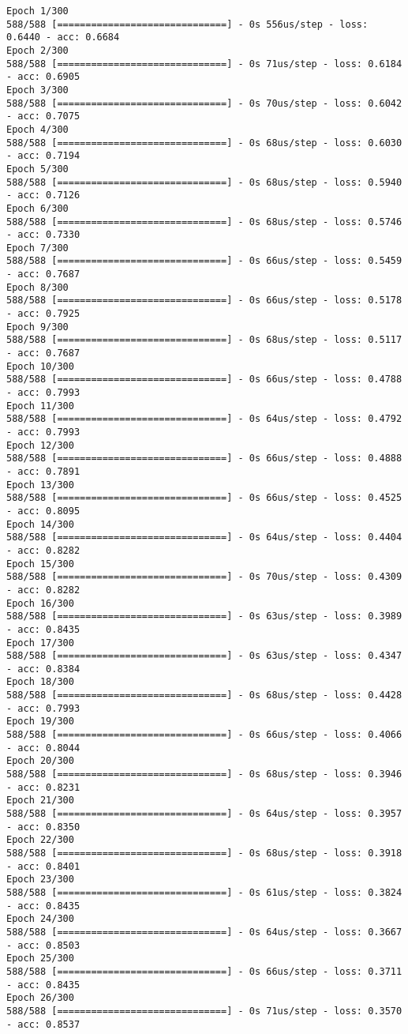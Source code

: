 \documentclass[11pt]{article}
\begin{document}
    \begin{Verbatim}[commandchars=\\\{\}]
Epoch 1/300
588/588 [==============================] - 0s 556us/step - loss: 0.6440 - acc: 0.6684
Epoch 2/300
588/588 [==============================] - 0s 71us/step - loss: 0.6184 - acc: 0.6905
Epoch 3/300
588/588 [==============================] - 0s 70us/step - loss: 0.6042 - acc: 0.7075
Epoch 4/300
588/588 [==============================] - 0s 68us/step - loss: 0.6030 - acc: 0.7194
Epoch 5/300
588/588 [==============================] - 0s 68us/step - loss: 0.5940 - acc: 0.7126
Epoch 6/300
588/588 [==============================] - 0s 68us/step - loss: 0.5746 - acc: 0.7330
Epoch 7/300
588/588 [==============================] - 0s 66us/step - loss: 0.5459 - acc: 0.7687
Epoch 8/300
588/588 [==============================] - 0s 66us/step - loss: 0.5178 - acc: 0.7925
Epoch 9/300
588/588 [==============================] - 0s 68us/step - loss: 0.5117 - acc: 0.7687
Epoch 10/300
588/588 [==============================] - 0s 66us/step - loss: 0.4788 - acc: 0.7993
Epoch 11/300
588/588 [==============================] - 0s 64us/step - loss: 0.4792 - acc: 0.7993
Epoch 12/300
588/588 [==============================] - 0s 66us/step - loss: 0.4888 - acc: 0.7891
Epoch 13/300
588/588 [==============================] - 0s 66us/step - loss: 0.4525 - acc: 0.8095
Epoch 14/300
588/588 [==============================] - 0s 64us/step - loss: 0.4404 - acc: 0.8282
Epoch 15/300
588/588 [==============================] - 0s 70us/step - loss: 0.4309 - acc: 0.8282
Epoch 16/300
588/588 [==============================] - 0s 63us/step - loss: 0.3989 - acc: 0.8435
Epoch 17/300
588/588 [==============================] - 0s 63us/step - loss: 0.4347 - acc: 0.8384
Epoch 18/300
588/588 [==============================] - 0s 68us/step - loss: 0.4428 - acc: 0.7993
Epoch 19/300
588/588 [==============================] - 0s 66us/step - loss: 0.4066 - acc: 0.8044
Epoch 20/300
588/588 [==============================] - 0s 68us/step - loss: 0.3946 - acc: 0.8231
Epoch 21/300
588/588 [==============================] - 0s 64us/step - loss: 0.3957 - acc: 0.8350
Epoch 22/300
588/588 [==============================] - 0s 68us/step - loss: 0.3918 - acc: 0.8401
Epoch 23/300
588/588 [==============================] - 0s 61us/step - loss: 0.3824 - acc: 0.8435
Epoch 24/300
588/588 [==============================] - 0s 64us/step - loss: 0.3667 - acc: 0.8503
Epoch 25/300
588/588 [==============================] - 0s 66us/step - loss: 0.3711 - acc: 0.8435
Epoch 26/300
588/588 [==============================] - 0s 71us/step - loss: 0.3570 - acc: 0.8537

\end{Verbatim}
\end{document}
